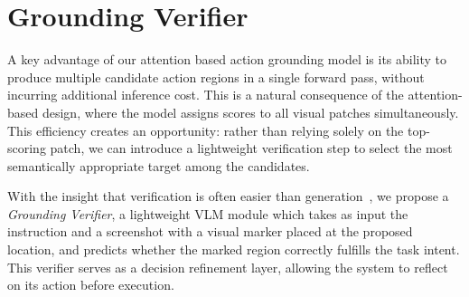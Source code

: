\documentclass{article}
\newcommand{\sys}{\texttt{GUI-Actor}\xspace}
\begin{document}
\section{Grounding Verifier}
A key advantage of our attention based action grounding model is its ability to produce multiple candidate action regions in a single forward pass, without incurring additional inference cost. This is a natural consequence of the attention-based design, where the model assigns scores to all visual patches simultaneously. This efficiency creates an opportunity: rather than relying solely on the top-scoring patch, we can introduce a lightweight verification step to select the most semantically appropriate target among the candidates.

With the insight that verification is often easier than generation~\citep{cobbe2021training}, we propose a \textit{Grounding Verifier}, a lightweight VLM module which takes as input the instruction and a screenshot with a visual marker placed at the proposed location, and predicts whether the marked region correctly fulfills the task intent. This verifier serves as a decision refinement layer, allowing the system to reflect on its action before execution. 
\end{document}
